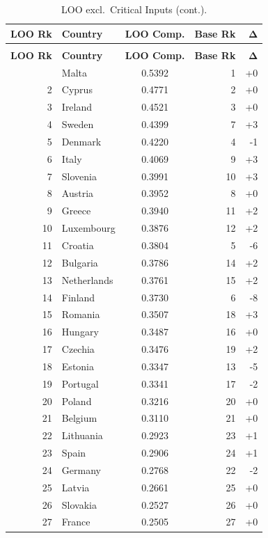 \begin{longtable}{@{}rl S[table-format=1.4] r r@{}}
\caption{LOO ranking excluding Critical Inputs.  Spearman $\rho = 0.9414$, Kendall $\tau = 0.8462$.}
\label{tab:loo-critical_inputs}\\
\toprule
{\textbf{LOO Rk}} & {\textbf{Country}} & {\textbf{LOO Comp.}} & {\textbf{Base Rk}} & {$\boldsymbol{\Delta}$} \\
\midrule
\endfirsthead
\caption[]{LOO excl.\ Critical Inputs (cont.).}\\
\toprule
{\textbf{LOO Rk}} & {\textbf{Country}} & {\textbf{LOO Comp.}} & {\textbf{Base Rk}} & {$\boldsymbol{\Delta}$} \\
\midrule
\endhead
\bottomrule
{} & Malta & 0.5392 & 1 & +0 \\
  2 & Cyprus & 0.4771 & 2 & +0 \\
  3 & Ireland & 0.4521 & 3 & +0 \\
  4 & Sweden & 0.4399 & 7 & +3 \\
  5 & Denmark & 0.4220 & 4 & -1 \\
  6 & Italy & 0.4069 & 9 & +3 \\
  7 & Slovenia & 0.3991 & 10 & +3 \\
  8 & Austria & 0.3952 & 8 & +0 \\
  9 & Greece & 0.3940 & 11 & +2 \\
  10 & Luxembourg & 0.3876 & 12 & +2 \\
  11 & Croatia & 0.3804 & 5 & -6 \\
  12 & Bulgaria & 0.3786 & 14 & +2 \\
  13 & Netherlands & 0.3761 & 15 & +2 \\
  14 & Finland & 0.3730 & 6 & -8 \\
  15 & Romania & 0.3507 & 18 & +3 \\
  16 & Hungary & 0.3487 & 16 & +0 \\
  17 & Czechia & 0.3476 & 19 & +2 \\
  18 & Estonia & 0.3347 & 13 & -5 \\
  19 & Portugal & 0.3341 & 17 & -2 \\
  20 & Poland & 0.3216 & 20 & +0 \\
  21 & Belgium & 0.3110 & 21 & +0 \\
  22 & Lithuania & 0.2923 & 23 & +1 \\
  23 & Spain & 0.2906 & 24 & +1 \\
  24 & Germany & 0.2768 & 22 & -2 \\
  25 & Latvia & 0.2661 & 25 & +0 \\
  26 & Slovakia & 0.2527 & 26 & +0 \\
  27 & France & 0.2505 & 27 & +0 \\
\end{longtable}